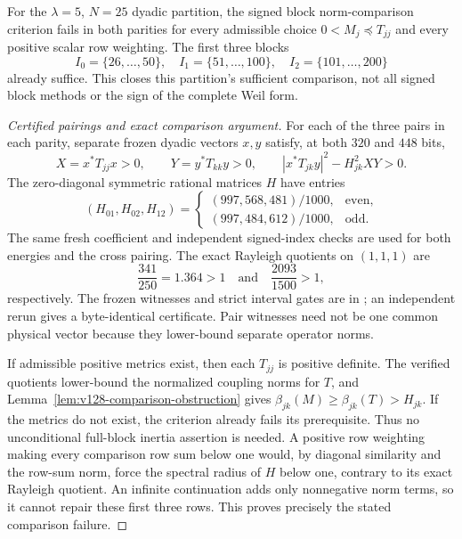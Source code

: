 \begin{proposition}
\label{prop:v152-block-comparison}
For the $\lambda=5$, $N=25$ dyadic partition, the signed block
norm-comparison criterion fails in both parities for every admissible
choice $0<M_j\preceq T_{jj}$ and every positive scalar row weighting.
The first three blocks
\[
 I_0=\{26,\ldots,50\},\quad I_1=\{51,\ldots,100\},\quad
 I_2=\{101,\ldots,200\}
\]
already suffice. This closes this partition's sufficient comparison,
not all signed block methods or the sign of the complete Weil form.
\end{proposition}
\begin{proof}[Certified pairings and exact comparison argument]
For each of the three pairs in each parity, separate frozen dyadic
vectors $x,y$ satisfy, at both $320$ and $448$ bits,
\[
 X=x^*T_{jj}x>0,\qquad Y=y^*T_{kk}y>0,\qquad
 |x^*T_{jk}y|^2-H_{jk}^2XY>0.
\]
The zero-diagonal symmetric rational matrices $H$ have entries
\[
 (H_{01},H_{02},H_{12})=
 \begin{cases}(997,568,481)/1000,&\text{even},\\
              (997,484,612)/1000,&\text{odd}.
 \end{cases}
\]
The same fresh coefficient and independent signed-index checks are
used for both energies and the cross pairing. The exact Rayleigh
quotients on $(1,1,1)$ are
\[
 \frac{341}{250}=1.364>1\quad\text{and}\quad
 \frac{2093}{1500}>1,
\]
respectively. The frozen witnesses and strict interval gates are in
; an independent rerun gives a
byte-identical certificate. Pair witnesses need not be one common
physical vector because they lower-bound separate operator norms.

If admissible positive metrics exist, then each $T_{jj}$ is positive
definite. The verified quotients lower-bound the normalized coupling
norms for $T$, and Lemma~\ref{lem:v128-comparison-obstruction} gives
$\beta_{jk}(M)\ge\beta_{jk}(T)>H_{jk}$. If the metrics do not exist,
the criterion already fails its prerequisite. Thus no unconditional
full-block inertia assertion is needed. A positive row weighting making
every comparison row sum below one would, by diagonal similarity and
the row-sum norm, force the spectral radius of $H$ below one, contrary
to its exact Rayleigh quotient. An infinite continuation adds only
nonnegative norm terms, so it cannot repair these first three rows.
This proves precisely the stated comparison failure.
\end{proof}

